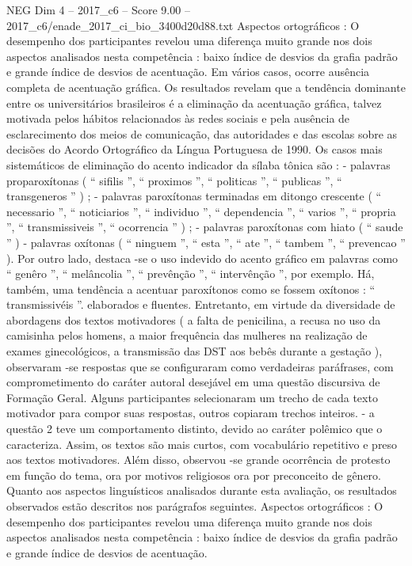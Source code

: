 \begin{textsample}{NEG Dim 4 – 2017\_c6 – Score 9.00 – 2017\_c6/enade\_2017\_ci\_bio\_3400d20d88.txt}
Aspectos ortográficos : O desempenho dos participantes revelou uma diferença muito grande nos dois aspectos analisados nesta competência : baixo índice de desvios da grafia padrão e grande índice de desvios de acentuação.
Em vários casos, ocorre ausência completa de acentuação gráfica.
Os resultados revelam que a tendência dominante entre os universitários brasileiros é a eliminação da acentuação gráfica, talvez motivada pelos hábitos relacionados às redes sociais e pela ausência de esclarecimento dos meios de comunicação, das autoridades e das escolas sobre as decisões do Acordo Ortográfico da Língua Portuguesa de 1990.
Os casos mais sistemáticos de eliminação do acento indicador da sílaba tônica são : - palavras proparoxítonas ( “ sifilis ”, “ proximos ”, “ politicas ”, “ publicas ”, “ transgeneros ” ) ; - palavras paroxítonas terminadas em ditongo crescente ( “ necessario ”, “ noticiarios ”, “ individuo ”, “ dependencia ”, “ varios ”, “ propria ”, “ transmissiveis ”, “ ocorrencia ” ) ; - palavras paroxítonas com hiato ( “ saude ” ) - palavras oxítonas ( “ ninguem ”, “ esta ”, “ ate ”, “ tambem ”, “ prevencao ” ).
Por outro lado, destaca -se o uso indevido do acento gráfico em palavras como “ genêro ”, “ melâncolia ”, “ prevênção ”, “ intervênção ”, por exemplo.
Há, também, uma tendência a acentuar paroxítonos como se fossem oxítonos : “ transmissivéis ”. elaborados e fluentes.
Entretanto, em virtude da diversidade de abordagens dos textos motivadores ( a falta de penicilina, a recusa no uso da camisinha pelos homens, a maior frequência das mulheres na realização de exames ginecológicos, a transmissão das DST aos bebês durante a gestação ), observaram -se respostas que se configuraram como verdadeiras paráfrases, com comprometimento do caráter autoral desejável em uma questão discursiva de Formação Geral.
Alguns participantes selecionaram um trecho de cada texto motivador para compor suas respostas, outros copiaram trechos inteiros. - a questão 2 teve um comportamento distinto, devido ao caráter polêmico que o caracteriza.
Assim, os textos são mais curtos, com vocabulário repetitivo e preso aos textos motivadores.
Além disso, observou -se grande ocorrência de protesto em função do tema, ora por motivos religiosos ora por preconceito de gênero.
Quanto aos aspectos linguísticos analisados durante esta avaliação, os resultados observados estão descritos nos parágrafos seguintes.
Aspectos ortográficos : O desempenho dos participantes revelou uma diferença muito grande nos dois aspectos analisados nesta competência : baixo índice de desvios da grafia padrão e grande índice de desvios de acentuação.

\end{textsample}
